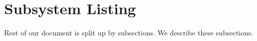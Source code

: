 
\section{Subsystem Listing}
\label{sec:subsystem_listing}

Rest of our document is split up by subsections. We describe these subsections. 

